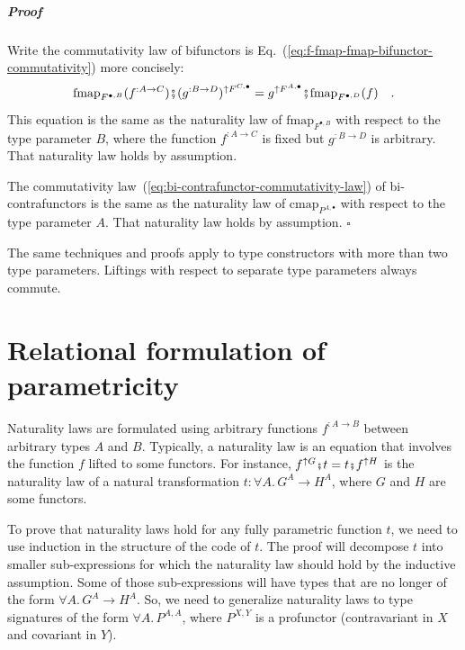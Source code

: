 \subparagraph{Proof}

Write the commutativity law of bifunctors is Eq.~(\ref{eq:f-fmap-fmap-bifunctor-commutativity})
more concisely:
\[
\text{fmap}_{F^{\bullet,B}}(f^{:A\rightarrow C})\bef(g^{:B\rightarrow D})^{\uparrow F^{C,\bullet}}=g^{\uparrow F^{A,\bullet}}\bef\text{fmap}_{F^{\bullet,D}}(f)\quad.
\]
This equation is the same as the naturality law of $\text{fmap}_{F^{\bullet,B}}$
with respect to the type parameter $B$, where the function $f^{:A\rightarrow C}$
is fixed but $g^{:B\rightarrow D}$ is arbitrary. That naturality
law holds by assumption.

The commutativity law~(\ref{eq:bi-contrafunctor-commutativity-law})
of bi-contrafunctors is the same as the naturality law of $\text{cmap}_{P^{A,\bullet}}$
with respect to the type parameter $A$. That naturality law holds
by assumption. $\square$

The same techniques and proofs apply to type constructors with more
than two type parameters. Liftings with respect to separate type
parameters always commute.

\section{Relational formulation of parametricity\label{sec:Parametricity-theorem-for-relations}}

Naturality laws are formulated using arbitrary functions $f^{:A\rightarrow B}$
between arbitrary types $A$ and $B$. Typically, a naturality law
is an equation that involves the function $f$ lifted to some functors.
For instance, $f^{\uparrow G}\bef t=t\bef f^{\uparrow H}$ is the
naturality law of a natural transformation $t:\forall A.\,G^{A}\rightarrow H^{A}$,
where $G$ and $H$ are some functors.

To prove that naturality laws hold for any fully parametric function
$t$, we need to use induction in the structure of the code of $t$.
The proof will decompose $t$ into smaller sub-expressions for which
the naturality law should hold by the inductive assumption. Some of
those sub-expressions will have types that are no longer of the form
$\forall A.\,G^{A}\rightarrow H^{A}$. So, we need to generalize naturality
laws to type signatures of the form $\forall A.\,P^{A,A}$, where
$P^{X,Y}$ is a profunctor (contravariant in $X$ and covariant in
$Y$). 

